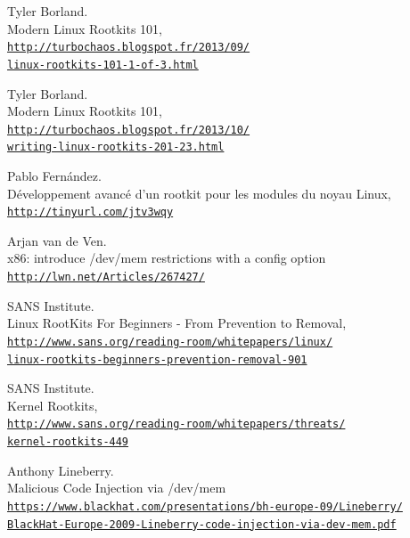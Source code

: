\documentclass[12pt]{article}
\begin{document}

\begin{thebibliography}{22}

Tyler Borland.\\
Modern Linux Rootkits 101,
\\\href{http://turbochaos.blogspot.fr/2013/09/linux-rootkits-101-1-of-3.html}{\texttt{http://turbochaos.blogspot.fr/2013/09/\\linux-rootkits-101-1-of-3.html}}

Tyler Borland.\\
Modern Linux Rootkits 101,
\\\href{http://turbochaos.blogspot.fr/2013/10/writing-linux-rootkits-201-23.html}{\texttt{http://turbochaos.blogspot.fr/2013/10/
\\writing-linux-rootkits-201-23.html}}

Pablo Fernández.\\
Développement avancé d'un rootkit pour les modules du noyau Linux,
\\\href{http://tinyurl.com/jtv3wqy}{\texttt{http://tinyurl.com/jtv3wqy}}

Arjan van de Ven. \\
x86: introduce /dev/mem restrictions with a config option
\\\href{http://lwn.net/Articles/267427/}{\texttt{http://lwn.net/Articles/267427/}}

SANS Institute.\\
Linux RootKits For Beginners - From Prevention to Removal,
\\\href{http://www.sans.org/reading-room/whitepapers/linux/linux-rootkits-beginners-prevention-removal-901}{\texttt{http://www.sans.org/reading-room/whitepapers/linux/
\\linux-rootkits-beginners-prevention-removal-901}}

SANS Institute.\\
Kernel Rootkits,
\\\href{http://www.sans.org/reading-room/whitepapers/threats/kernel-rootkits-449}{\texttt{http://www.sans.org/reading-room/whitepapers/threats/
\\kernel-rootkits-449}}

Anthony Lineberry. \\
Malicious Code Injection via /dev/mem
\\\href{https://www.blackhat.com/presentations/bh-europe-09/Lineberry/BlackHat-Europe-2009-Lineberry-code-injection-via-dev-mem.pdf}{\texttt{https://www.blackhat.com/presentations/bh-europe-09/Lineberry/
\\BlackHat-Europe-2009-Lineberry-code-injection-via-dev-mem.pdf}}


\end{thebibliography}
\end{document}
